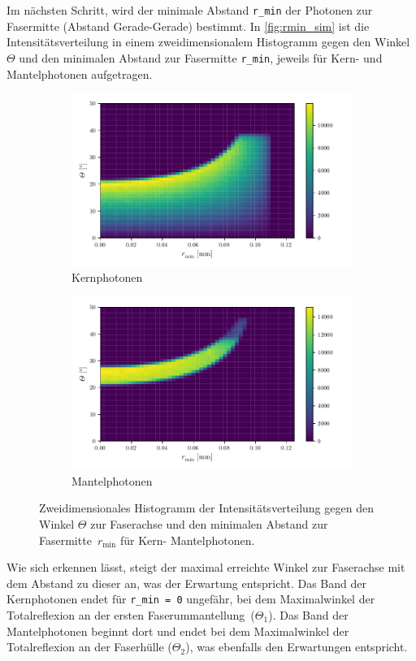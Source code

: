 Im nächsten Schritt, wird der minimale Abstand \texttt{r\_min} der Photonen zur Fasermitte (Abstand Gerade-Gerade) bestimmt.
In \autoref{fig:rmin_sim} ist die Intensitätsverteilung in einem zweidimensionalem Histogramm gegen den Winkel $\Theta$ und den minimalen Abstand zur Fasermitte \texttt{r\_min},
jeweils für Kern- und Mantelphotonen aufgetragen.
\begin{figure}
  \centering
  \begin{subfigure}{0.45\textwidth}
    \includegraphics[width = 1.2\textwidth]{content/pics/rmin_sim_core.pdf}
    \caption{Kernphotonen}
    \label{fig:rmin_sim_core}
  \end{subfigure}
  \hfill
  \begin{subfigure}{0.45\textwidth}
    \includegraphics[width = 1.2\textwidth]{content/pics/rmin_sim_cladding.pdf}
    \caption{Mantelphotonen}
    \label{fig:rmin_sim_cladding}
  \end{subfigure}
  \caption{Zweidimensionales Histogramm der Intensitätsverteilung gegen den Winkel $\Theta$ zur Faserachse und den minimalen Abstand zur Fasermitte~$r_\text{min}$ für Kern-
  Mantelphotonen.}
  \label{fig:rmin_sim}
\end{figure}
Wie sich erkennen lässt, steigt der maximal erreichte Winkel zur Faserachse mit dem Abstand zu dieser an, was der Erwartung entspricht.
Das Band der Kernphotonen endet für \texttt{r\_min = 0} ungefähr, bei dem Maximalwinkel der Totalreflexion an der ersten Faserummantellung~($\Theta_1$). Das Band der 
Mantelphotonen beginnt dort und endet bei dem Maximalwinkel der Totalreflexion an der Faserhülle ($\Theta_2$), was ebenfalls den Erwartungen entspricht.

